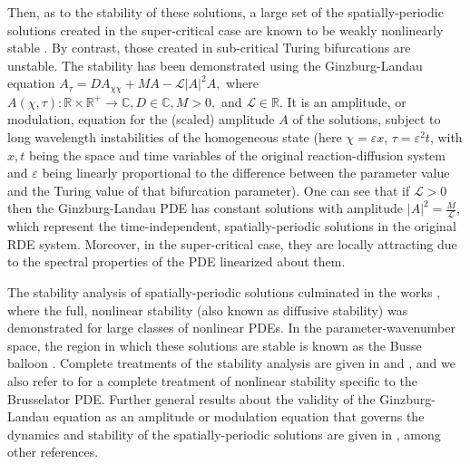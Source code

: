 \documentclass[11pt]{article}
\numberwithin{equation}{section}
\begin{document}
Then, as to the stability of these solutions, a large set of the spatially-periodic solutions created in the super-critical case are known to be weakly nonlinearly stable \cite{CE1990,CH1993,DES1971,E1965,E1993,JZ2010,NW1969,S1983,SS1971}.
By contrast, those created 
in sub-critical Turing bifurcations are unstable.
The stability has been demonstrated using the Ginzburg-Landau equation 
$A_\tau = D A_{\chi \chi} + M A  - \mathcal{L} \vert A \vert^2 A,$
where $A(\chi,\tau): \mathbb{R} \times \mathbb{R}^+ \to \mathbb{C}, D \in \mathbb{C}, M>0, $ and
$\mathcal{L} \in \mathbb{R}$.
It is an amplitude, or modulation, equation for the (scaled) amplitude $A$ of the solutions, subject to long wavelength instabilities of the homogeneous state (here $\chi = \varepsilon x$, $\tau=\varepsilon^2 t$, with $x,t$ being the space and time variables of the 
original reaction-diffusion system and $\varepsilon$ being linearly proportional to the difference between the parameter value and the Turing value of that bifurcation parameter).
One can see that if $\mathcal{L}>0$ then the Ginzburg-Landau PDE has constant solutions with amplitude $\vert A \vert^2 = \frac{M}{\mathcal{L}}$, which represent the time-independent, spatially-periodic solutions in the original RDE system.
Moreover, in the super-critical case, they are locally attracting due to the spectral properties of the PDE linearized about them.

The stability analysis of spatially-periodic solutions culminated in the works \cite{CE1990,JZ2010,S1996,S1998}, where the full, nonlinear stability (also known as diffusive stability) was demonstrated for large classes of 
nonlinear PDEs.
In the parameter-wavenumber space, the region in which these solutions are stable is known as the Busse balloon \cite{AACS2025,B1978,D2019,K1984,N2002,SDHR2013}.
Complete treatments of the stability analysis are given in \cite{M2002} and \cite{SU2017}, and we also refer to \cite{SZJV2018} for a complete treatment of nonlinear stability specific to the Brusselator PDE.
Further general results about the validity of the Ginzburg-Landau equation
as an amplitude or modulation equation that governs
the dynamics and stability of the spatially-periodic solutions
are given in
\cite{D2019,E1993,vH1991,MS1995,SU2017}, among other references.
\end{document}
